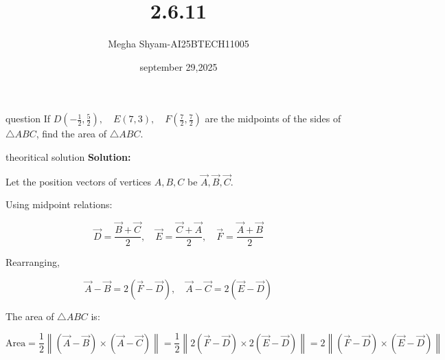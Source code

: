 \documentclass{beamer}
\title %
{2.6.11}
\date{september 29,2025}
\author %
{Megha Shyam-AI25BTECH11005}
\begin{document}
\begin{frame}{question}
    If \( D\left(-\frac{1}{2}, \frac{5}{2}\right), \quad E(7,3), \quad F\left(\frac{7}{2}, \frac{7}{2}\right) \) are the midpoints of the sides of \(\triangle ABC\), find the area of \(\triangle ABC\).

\end{frame}
\begin{frame}{theoritical solution}
   \textbf{Solution:}

Let the position vectors of vertices \(A, B, C\) be \(\vec{A}, \vec{B}, \vec{C}\).

Using midpoint relations:

\[
\vec{D} = \frac{\vec{B} + \vec{C}}{2}, \quad \vec{E} = \frac{\vec{C} + \vec{A}}{2}, \quad \vec{F} = \frac{\vec{A} + \vec{B}}{2}
\]

Rearranging,

\[
\vec{A} - \vec{B} = 2(\vec{F} - \vec{D}), \quad \vec{A} - \vec{C} = 2(\vec{E} - \vec{D})
\]

The area of \(\triangle ABC\) is:

\[
\text{Area} = \frac{1}{2} \left\| (\vec{A} - \vec{B}) \times (\vec{A} - \vec{C}) \right\| = \frac{1}{2} \left\| 2(\vec{F} - \vec{D}) \times 2(\vec{E} - \vec{D}) \right\| =
2 \left\| (\vec{F} - \vec{D}) \times (\vec{E} - \vec{D}) \right\|
\]
\end{frame}
\end{document}
